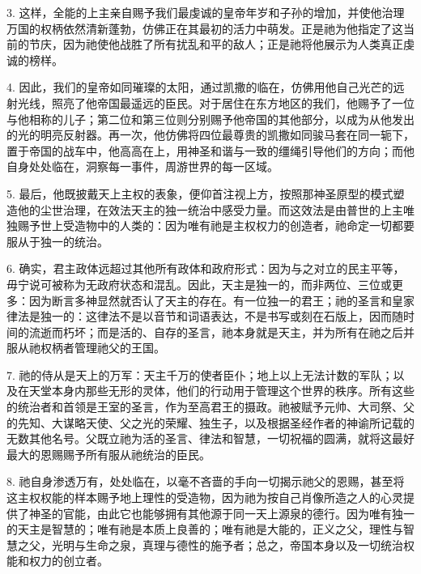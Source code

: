 3. 这样，全能的上主亲自赐予我们最虔诚的皇帝年岁和子孙的增加，并使他治理万国的权柄依然清新蓬勃，仿佛正在其最初的活力中萌发。正是祂为他指定了这当前的节庆，因为祂使他战胜了所有扰乱和平的敌人；正是祂将他展示为人类真正虔诚的榜样。\par

4. 因此，我们的皇帝如同璀璨的太阳，通过凯撒的临在，仿佛用他自己光芒的远射光线，照亮了他帝国最遥远的臣民。对于居住在东方地区的我们，他赐予了一位与他相称的儿子；第二位和第三位则分别赐予他帝国的其他部分，以成为从他发出的光的明亮反射器。再一次，他仿佛将四位最尊贵的凯撒如同骏马套在同一轭下，置于帝国的战车中，他高高在上，用神圣和谐与一致的缰绳引导他们的方向；而他自身处处临在，洞察每一事件，周游世界的每一区域。\par

5. 最后，他既披戴天上主权的表象，便仰首注视上方，按照那神圣原型的模式塑造他的尘世治理，在效法天主的独一统治中感受力量。而这效法是由普世的上主唯独赐予世上受造物中的人类的：因为唯有祂是主权权力的创造者，祂命定一切都要服从于独一的统治。\par

6. 确实，君主政体远超过其他所有政体和政府形式：因为与之对立的民主平等，毋宁说可被称为无政府状态和混乱。因此，天主是独一的，而非两位、三位或更多：因为断言多神显然就否认了天主的存在。有一位独一的君王；祂的圣言和皇家律法是独一的：这律法不是以音节和词语表达，不是书写或刻在石版上，因而随时间的流逝而朽坏；而是活的、自存的圣言，祂本身就是天主，并为所有在祂之后并服从祂权柄者管理祂父的王国。\par

7. 祂的侍从是天上的万军：天主千万的使者臣仆；地上以上无法计数的军队；以及在天堂本身内那些无形的灵体，他们的行动用于管理这个世界的秩序。所有这些的统治者和首领是王室的圣言，作为至高君王的摄政。祂被赋予元帅、大司祭、父的先知、大谋略天使、父之光的荣耀、独生子，以及根据圣经作者的神谕所记载的无数其他名号。父既立祂为活的圣言、律法和智慧，一切祝福的圆满，就将这最好最大的恩赐赐予所有服从祂统治的臣民。\par

8. 祂自身渗透万有，处处临在，以毫不吝啬的手向一切揭示祂父的恩赐，甚至将这主权权能的样本赐予地上理性的受造物，因为祂为按自己肖像所造之人的心灵提供了神圣的官能，由此它也能够拥有其他源于同一天上源泉的德行。因为唯有独一的天主是智慧的；唯有祂是本质上良善的；唯有祂是大能的，正义之父，理性与智慧之父，光明与生命之泉，真理与德性的施予者；总之，帝国本身以及一切统治权能和权力的创立者。\par

